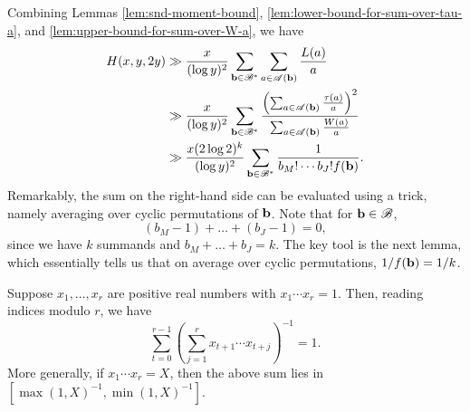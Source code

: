 Combining Lemmas \ref{lem:snd-moment-bound}, \ref{lem:lower-bound-for-sum-over-tau-a}, and \ref{lem:upper-bound-for-sum-over-W-a}, we have
\begin{align} \label{eq:estimate-h-x-y-2y-by-sum-over-f-b}
    H(x, y, 2y) &\gg \frac{x}{(\log y)^2} \sum \limits_{\mathbf{b} \in \mathscr{B}^*} \sum \limits_{a \in \mathscr{A}(\mathbf{b})} \frac{L(a)}{a} \nonumber \\ 
    &\gg \frac{x}{(\log y)^2} \sum \limits_{\mathbf{b} \in \mathscr{B}^*} \frac{\left(\sum_{a \in \mathscr{A}(\mathbf{b})} \frac{\tau (a)}{a} \right)^2}{\sum_{a \in \mathscr{A}(\mathbf{b})} \frac{W(a)}{a}} \nonumber \\
    &\gg \frac{x(2 \log 2)^k}{(\log y)^2}  \sum \limits_{\mathbf{b} \in \mathscr{B}^*} \frac{1}{b_M! \cdots b_J! f(\mathbf{b})}.
\end{align}
Remarkably, the sum on the right-hand side can be evaluated using a trick, namely averaging over cyclic permutations of $\mathbf{b}$.
Note that for $\mathbf{b} \in \mathscr{B}$,
\begin{equation} \label{eq:exponents-in-f-of-b-sum-to-zero}
    (b_M - 1) + \dots + (b_J - 1) = 0,
\end{equation}
since we have $k$ summands and $b_M + \dots + b_J = k$.
The key tool is the next lemma, which essentially tells us that on average over cyclic permutations, $1/f(\mathbf{b}) = 1/k$.

\begin{lemma}
    Suppose $x_1, \dots, x_r$ are positive real numbers with $x_1 \cdots x_r = 1$. 
    Then, reading indices modulo $r$, we have
    \begin{equation*}
        \sum \limits_{t = 0}^{r - 1} \left( \sum \limits_{j = 1}^r x_{t + 1} \cdots x_{t + j} \right)^{-1} = 1.
    \end{equation*}
    More generally, if $x_1 \cdots x_r = X$, then the above sum lies in $[\max(1, X)^{-1}, \min(1, X)^{-1}]$.
\end{lemma}

